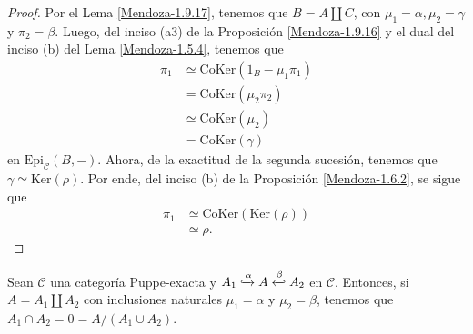 \documentclass[tesis]{subfiles}
\begin{document}
\begin{proof}
    Por el Lema \ref{Mendoza-1.9.17}, tenemos que $B=A\coprod C$, con $\mu_1=\alpha, \mu_2=\gamma$ y $\pi_2=\beta$. Luego, del inciso (a3) de la Proposición \ref{Mendoza-1.9.16} y el dual del inciso (b) del Lema \ref{Mendoza-1.5.4}, tenemos que
    \begin{align*}
        \pi_1 &\simeq \text{CoKer}(1_B - \mu_1\pi_1) \\
              &= \text{CoKer}(\mu_2\pi_2) \\
              &\simeq \text{CoKer}(\mu_2) \\
              &= \text{CoKer}(\gamma)
    \end{align*}
    en $\text{Epi}_\mathscr{C}(B,-)$. Ahora, de la exactitud de la segunda sucesión, tenemos que $\gamma\simeq\text{Ker}(\rho)$. Por ende, del inciso (b) de la Proposición \ref{Mendoza-1.6.2}, se sigue que
    \begin{align*}
        \pi_1 &\simeq \text{CoKer}(\text{Ker}(\rho)) \\
              &\simeq \rho.
    \end{align*}
\end{proof}

\begin{Prop}\label{Mendoza-1.9.20}
%
%    
%
    Sean $\mathscr{C}$ una categoría Puppe-exacta y $A_1\xhookrightarrow{\alpha} A \xhookleftarrow{\beta} A_2$ en $\mathscr{C}$. Entonces, si $A = A_1\coprod A_2$ con inclusiones naturales $\mu_1=\alpha$ y $\mu_2=\beta$, tenemos que $A_1\cap A_2= 0 = A/(A_1\cup A_2)$.
\end{Prop}
\end{document}
